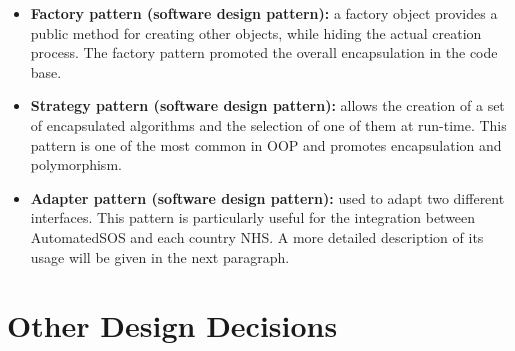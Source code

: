 \begin{itemize}
    \item \textbf{Factory pattern (software design pattern):} a factory object provides a public method for creating other objects, while hiding the actual creation process. The factory pattern promoted the overall encapsulation in the code base.
    \item \textbf{Strategy pattern (software design pattern):} allows the creation of a set of encapsulated algorithms and the selection of one of them at run-time. This pattern is one of the most common in OOP and promotes encapsulation and polymorphism.
    \item \textbf{Adapter pattern (software design pattern):} used to adapt two different interfaces. This pattern is particularly useful for the integration between AutomatedSOS and each country NHS. A more detailed description of its usage will be given in the next paragraph. 
\end{itemize}

\section{Other Design Decisions}

